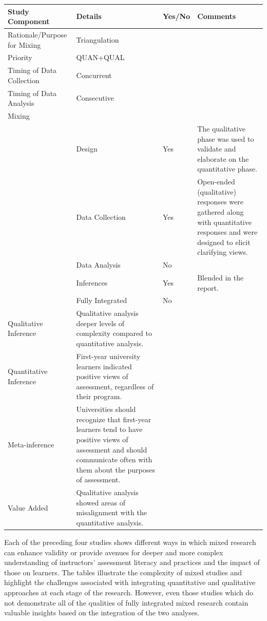 \documentclass[
]{book}
\begin{document}
\begin{longtable}[]{@{}
  >{\raggedright\arraybackslash}p{}
  >{\raggedright\arraybackslash}p{}
  >{\raggedright\arraybackslash}p{}
  >{\raggedright\arraybackslash}p{}@{}}
\toprule
Study Component & Details & Yes/No & Comments \\
\midrule
\endhead
Rationale/Purpose for Mixing & Triangulation & & \\
Priority & QUAN+QUAL & & \\
Timing of Data Collection & Concurrent & & \\
Timing of Data Analysis & Consecutive & & \\
Mixing & & & \\
& Design & Yes & The qualitative phase was used to validate and elaborate on the quantitative phase. \\
& Data Collection & Yes & Open-ended (qualitative) responses were gathered along with quantitative responses and were designed to elicit clarifying views. \\
& Data Analysis & No & \\
& Inferences & Yes & Blended in the report. \\
& Fully Integrated & No & \\
Qualitative Inference & Qualitative analysis deeper levels of complexity compared to quantitative analysis. & & \\
Quantitative Inference & First-year university learners indicated positive views of assessment, regardless of their program. & & \\
Meta-inference & Universities should recognize that first-year learners tend to have positive views of assessment and should communicate often with them about the purposes of assessment. & & \\
Value Added & Qualitative analysis showed areas of misalignment with the quantitative analysis. & & \\
\bottomrule
\end{longtable}

Each of the preceding four studies shows different ways in which mixed research can enhance validity or provide avenues for deeper and more complex understanding of instructors' assessment literacy and practices and the impact of those on learners. The tables illustrate the complexity of mixed studies and highlight the challenges associated with integrating quantitative and qualitative approaches at each stage of the research. However, even those studies which do not demonstrate all of the qualities of fully integrated mixed research contain valuable insights based on the integration of the two analyses.
\end{document}
